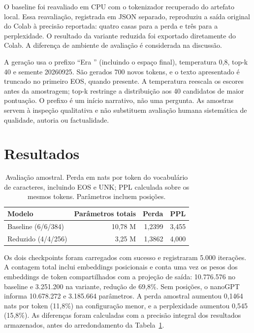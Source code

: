 \documentclass[conference]{IEEEtran}
\begin{document}
O baseline foi reavaliado em CPU com o tokenizador recuperado do artefato local. Essa reavaliação, registrada em JSON separado, reproduziu a saída original do Colab à precisão reportada: quatro casas para a perda e três para a perplexidade. O resultado da variante reduzida foi exportado diretamente do Colab. A diferença de ambiente de avaliação é considerada na discussão.

A geração usa o prefixo ``Era '' (incluindo o espaço final), temperatura 0,8, top-k 40 e semente 20260925. São gerados 700 novos tokens, e o texto apresentado é truncado no primeiro EOS, quando presente. A temperatura reescala os escores antes da amostragem; top-k restringe a distribuição aos 40 candidatos de maior pontuação. O prefixo é um início narrativo, não uma pergunta. As amostras servem à inspeção qualitativa e não substituem avaliação humana sistemática de qualidade, autoria ou factualidade.

\section{Resultados}

\begin{table}[t]
\caption{Avaliação amostral. Perda em nats por token do vocabulário de caracteres, incluindo EOS e UNK; PPL calculada sobre os mesmos tokens. Parâmetros incluem posições.}
\label{tab:comparison}
\centering
\begin{tabular}{lrrr}
\toprule
Modelo & Parâmetros totais & Perda & PPL \\
\midrule
Baseline (6/6/384) & 10,78 M & 1,2399 & 3,455 \\
Reduzido (4/4/256) & 3,25 M & 1,3862 & 4,000 \\
\bottomrule
\end{tabular}
\end{table}

Os dois checkpoints foram carregados com sucesso e registraram 5.000 iterações. A contagem total inclui embeddings posicionais e conta uma vez os pesos dos embeddings de token compartilhados com a projeção de saída: 10.776.576 no baseline e 3.251.200 na variante, redução de 69,8\%. Sem posições, o nanoGPT informa 10.678.272 e 3.185.664 parâmetros. A perda amostral aumentou 0,1464 nats por token (11,8\%) na configuração menor, e a perplexidade aumentou 0,545 (15,8\%). As diferenças foram calculadas com a precisão integral dos resultados armazenados, antes do arredondamento da Tabela~\ref{tab:comparison}.
\end{document}
